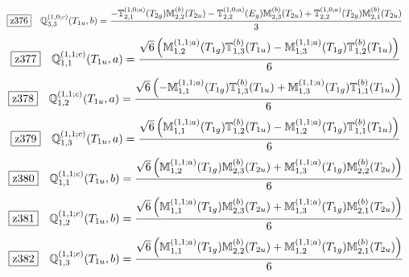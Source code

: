 \documentclass[fleqn,10pt,landscape]{jsarticle}
\begin{document}
\begin{dmath*}
\hspace*{3mm}\fbox{z376}\quad \mathbb{Q}_{3,3}^{(1,0;c)}(T_{1u},b)=\frac{- \mathbb{T}_{2,1}^{(1,0;a)}(T_{2g}) \mathbb{M}_{2,2}^{(b)}(T_{2u}) - \mathbb{T}_{2,2}^{(1,0;a)}(E_{g}) \mathbb{M}_{2,3}^{(b)}(T_{2u}) + \mathbb{T}_{2,2}^{(1,0;a)}(T_{2g}) \mathbb{M}_{2,1}^{(b)}(T_{2u})}{3}
\end{dmath*}
\begin{dmath*}
\hspace*{3mm}\fbox{z377}\quad \mathbb{Q}_{1,1}^{(1,1;c)}(T_{1u},a)=\frac{\sqrt{6} \left(\mathbb{M}_{1,2}^{(1,1;a)}(T_{1g}) \mathbb{T}_{1,3}^{(b)}(T_{1u}) - \mathbb{M}_{1,3}^{(1,1;a)}(T_{1g}) \mathbb{T}_{1,2}^{(b)}(T_{1u})\right)}{6}
\end{dmath*}
\begin{dmath*}
\hspace*{3mm}\fbox{z378}\quad \mathbb{Q}_{1,2}^{(1,1;c)}(T_{1u},a)=\frac{\sqrt{6} \left(- \mathbb{M}_{1,1}^{(1,1;a)}(T_{1g}) \mathbb{T}_{1,3}^{(b)}(T_{1u}) + \mathbb{M}_{1,3}^{(1,1;a)}(T_{1g}) \mathbb{T}_{1,1}^{(b)}(T_{1u})\right)}{6}
\end{dmath*}
\begin{dmath*}
\hspace*{3mm}\fbox{z379}\quad \mathbb{Q}_{1,3}^{(1,1;c)}(T_{1u},a)=\frac{\sqrt{6} \left(\mathbb{M}_{1,1}^{(1,1;a)}(T_{1g}) \mathbb{T}_{1,2}^{(b)}(T_{1u}) - \mathbb{M}_{1,2}^{(1,1;a)}(T_{1g}) \mathbb{T}_{1,1}^{(b)}(T_{1u})\right)}{6}
\end{dmath*}
\begin{dmath*}
\hspace*{3mm}\fbox{z380}\quad \mathbb{Q}_{1,1}^{(1,1;c)}(T_{1u},b)=\frac{\sqrt{6} \left(\mathbb{M}_{1,2}^{(1,1;a)}(T_{1g}) \mathbb{M}_{2,3}^{(b)}(T_{2u}) + \mathbb{M}_{1,3}^{(1,1;a)}(T_{1g}) \mathbb{M}_{2,2}^{(b)}(T_{2u})\right)}{6}
\end{dmath*}
\begin{dmath*}
\hspace*{3mm}\fbox{z381}\quad \mathbb{Q}_{1,2}^{(1,1;c)}(T_{1u},b)=\frac{\sqrt{6} \left(\mathbb{M}_{1,1}^{(1,1;a)}(T_{1g}) \mathbb{M}_{2,3}^{(b)}(T_{2u}) + \mathbb{M}_{1,3}^{(1,1;a)}(T_{1g}) \mathbb{M}_{2,1}^{(b)}(T_{2u})\right)}{6}
\end{dmath*}
\begin{dmath*}
\hspace*{3mm}\fbox{z382}\quad \mathbb{Q}_{1,3}^{(1,1;c)}(T_{1u},b)=\frac{\sqrt{6} \left(\mathbb{M}_{1,1}^{(1,1;a)}(T_{1g}) \mathbb{M}_{2,2}^{(b)}(T_{2u}) + \mathbb{M}_{1,2}^{(1,1;a)}(T_{1g}) \mathbb{M}_{2,1}^{(b)}(T_{2u})\right)}{6}
\end{dmath*}
\end{document}
